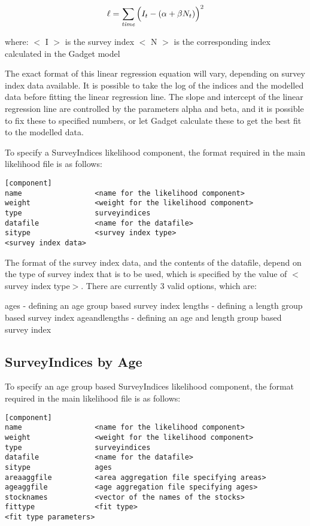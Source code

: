 \documentclass [a4paper, 10pt]{book}
\begin{document}
\newpage %
\begin{equation}\label{eq:surveyindex}
\ell = \sum_{\it time}\Big(I_{t} - (\alpha + \beta N_{t})\Big)^2
\end{equation}

where:\newline
$<$ I $>$ is the survey index\newline
$<$ N $>$ is the corresponding index calculated in the Gadget model

\bigskip
The exact format of this linear regression equation will vary, depending on survey index data available.  It is possible to take the log of the indices and the modelled data before fitting the linear regression line.  The slope and intercept of the linear regression line are controlled by the parameters alpha and beta, and it is possible to fix these to specified numbers, or let Gadget calculate these to get the best fit to the modelled data.

\bigskip
To specify a SurveyIndices likelihood component, the format required in the main likelihood file is as follows:

{\small\begin{verbatim}
[component]
name                 <name for the likelihood component>
weight               <weight for the likelihood component>
type                 surveyindices
datafile             <name for the datafile>
sitype               <survey index type>
<survey index data>
\end{verbatim}}

The format of the survey index data, and the contents of the datafile, depend on the type of survey index that is to be used, which is specified by the value of $<$survey index type$>$.  There are currently 3 valid options, which are:

\bigskip
ages - defining an age group based survey index\newline
lengths - defining a length group based survey index\newline
ageandlengths - defining an age and length group based survey index

\subsection{SurveyIndices by Age}\label{subsec:sibyage}
To specify an age group based SurveyIndices likelihood component, the format required in the main likelihood file is as follows:

{\small\begin{verbatim}
[component]
name                 <name for the likelihood component>
weight               <weight for the likelihood component>
type                 surveyindices
datafile             <name for the datafile>
sitype               ages
areaaggfile          <area aggregation file specifying areas>
ageaggfile           <age aggregation file specifying ages>
stocknames           <vector of the names of the stocks>
fittype              <fit type>
<fit type parameters>
\end{verbatim}}
\end{document}
